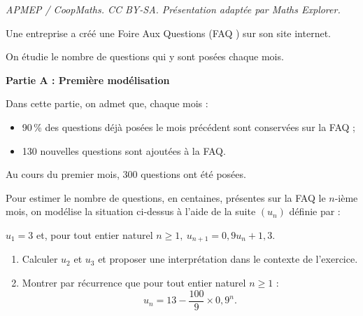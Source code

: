 \documentclass[10pt]{article}
\begin{document}
\noindent\textit{APMEP / CoopMaths. CC BY-SA. Présentation adaptée par Maths Explorer.}\par\medskip
\medskip

Une entreprise a créé une Foire Aux Questions (\og FAQ \fg) sur son site internet.

\medskip

On étudie le nombre de questions qui y sont posées chaque mois.

\bigskip

\textbf{Partie A : Première modélisation}

\medskip

Dans cette partie, on admet que, chaque mois :

\begin{itemize}
\item[$\bullet~~$]90\,\% des questions déjà posées le mois précédent sont conservées sur la FAQ ;
\item[$\bullet~~$]130 nouvelles questions sont ajoutées à la FAQ.
\end{itemize}

Au cours du premier mois, $300$ questions ont été posées.

\medskip

Pour estimer le nombre de questions, en centaines, présentes sur la FAQ le $n$-ième
mois, on modélise la situation ci-dessus à l'aide de la suite $\left(u_n\right)$ définie par : \begin{center}$u_1 =3$ \quad et, pour tout entier naturel $n \geqslant 1,\:u_{n+1} = 0,9u_n + 1,3$.\end{center}

\smallskip

\begin{enumerate}
\item Calculer $u_2$ et $u_3$ et proposer une interprétation dans le contexte de l'exercice. \item Montrer par récurrence que pour tout entier naturel $n \geqslant 1$ :
\[u_n = 13 - \dfrac{100}{9} \times 0,9^n.\]
\end{enumerate}
\end{document}
